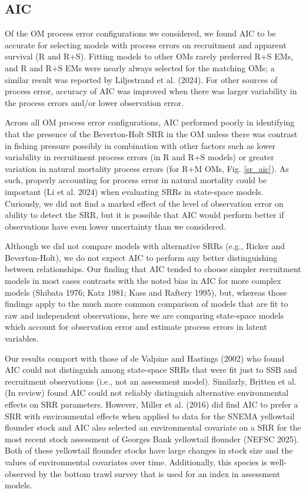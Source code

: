 \documentclass[
  12pt,
]{article}
\begin{document}
\subsection*{AIC}\label{aic}

Of the OM process error configurations we considered, we found AIC to be
accurate for selecting models with process errors on recruitment and
apparent survival (R and R+S). Fitting models to other OMs rarely
preferred R+S EMs, and R and R+S EMs were nearly always selected for the
matching OMs; a similar result was reported by Liljestrand et al.
(2024). For other sources of process error, accuracy of AIC was improved
when there was larger variability in the process errors and/or lower
observation error.

Across all OM process error configurations, AIC performed poorly in
identifying that the presence of the Beverton-Holt SRR in the OM unless
there was contrast in fishing pressure possibly in combination with
other factors such as lower variability in recruitment process errors
(in R and R+S models) or greater variation in natural mortality process
errors (for R+M OMs, Fig. \ref{sr_aic}). As such, properly accounting
for process error in natural mortality could be important (Li et al.
2024) when evaluating SRRs in state-space models. Curiously, we did not
find a marked effect of the level of observation error on ability to
detect the SRR, but it is possible that AIC would perform better if
observations have even lower uncertainty than we considered.

Although we did not compare models with alternative SRRs (e.g., Ricker
and Beverton-Holt), we do not expect AIC to perform any better
distinguishing between relationships. Our finding that AIC tended to
choose simpler recruitment models in most cases contrasts with the noted
bias in AIC for more complex models (Shibata 1976; Katz 1981; Kass and
Raftery 1995), but, whereas those findings apply to the much more common
comparison of models that are fit to raw and independent observations,
here we are comparing state-space models which account for observation
error and estimate process errors in latent variables.

Our results comport with those of {de Valpine and Hastings} (2002) who
found AIC could not distinguish among state-space SRRs that were fit
just to SSB and recruitment observations (i.e., not an assessment
model). Similarly, Britten et al. (In review) found AIC could not
reliably distinguish alternative environmental effects on SRR
parameters. However, Miller et al. (2016) did find AIC to prefer a SRR
with environmental effects when applied to data for the SNEMA yellowtail
flounder stock and AIC also selected an environmental covariate on a SRR
for the most recent stock assessment of Georges Bank yellowtail flounder
(NEFSC 2025). Both of these yellowtail flounder stocks have large
changes in stock size and the values of environmental covariates over
time. Additionally, this species is well-observed by the bottom trawl
survey that is used for an index in assessment models.
\end{document}
